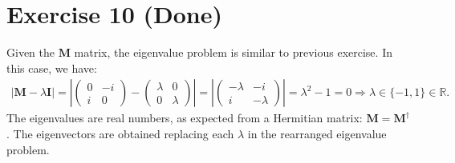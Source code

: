 \documentclass[letterpaper,11pt,twoside]{article}
\begin{document}
\section{Exercise 10 (Done)}
Given the $\bm{M}$ matrix, the eigenvalue problem is similar to previous exercise. In this case, we have:
\begin{align*}
  \left|\bm{M}-\lambda\bm{I}\right|=
  \left|\begin{pmatrix}
    0&-i\\i&0
  \end{pmatrix}-\begin{pmatrix}
    \lambda&0\\0&\lambda
  \end{pmatrix}\right|=\left|\begin{pmatrix}
    -\lambda&-i\\i&-\lambda
  \end{pmatrix}\right|=\lambda^2-1=0\Longrightarrow\lambda\in\{-1,1\}\in\mathbb{R}.
\end{align*}
The eigenvalues are real numbers, as expected from a Hermitian matrix: $\bm{M}=\bm{M}^\dagger$.
The eigenvectors are obtained replacing each $\lambda$ in the rearranged eigenvalue problem.
\end{document}
